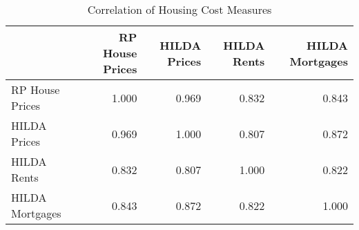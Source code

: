 \begin{table}[htpb]
\centering
\caption{Correlation of Housing Cost Measures} 
\label{houseCor}
\begin{tabular}{lrrrr}
  \toprule
 & \parbox[t]{0.14\textwidth}{\centering RP House Prices} & \parbox[t]{0.14\textwidth}{\centering HILDA Prices} & \parbox[t]{0.14\textwidth}{\centering HILDA Rents} & \parbox[t]{0.14\textwidth}{\centering HILDA Mortgages} \\ 
  \midrule
RP House Prices & 1.000 & 0.969 & 0.832 & 0.843 \\ 
  HILDA Prices & 0.969 & 1.000 & 0.807 & 0.872 \\ 
  HILDA Rents & 0.832 & 0.807 & 1.000 & 0.822 \\ 
  HILDA Mortgages & 0.843 & 0.872 & 0.822 & 1.000 \\ 
   \bottomrule
\end{tabular}
\end{table}
